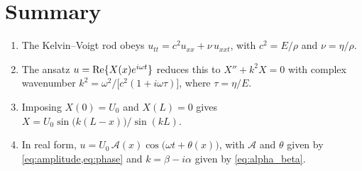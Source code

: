 \section{Summary}

\begin{enumerate}
  \item The Kelvin--Voigt rod obeys
        $u_{tt} = c^2 u_{xx} + \nu\, u_{xxt}$, with $c^2 = E/\rho$ and $\nu = \eta/\rho$.
  \item The ansatz $u = \operatorname{Re}\{X(x)e^{i\omega t}\}$ reduces this to
        $X'' + k^2 X = 0$ with complex wavenumber
        $k^2 = \omega^2/\big[c^2(1+i\omega\tau)\big]$, where $\tau = \eta/E$.
  \item Imposing $X(0)=U_0$ and $X(L)=0$ gives
        $X = U_0\sin\!\big(k(L-x)\big)/\sin(kL)$.
  \item In real form,
        $u = U_0\,\mathcal{A}(x)\cos\!\big(\omega t + \theta(x)\big)$, with
        $\mathcal{A}$ and $\theta$ given by \cref{eq:amplitude,eq:phase} and
        $k = \beta - i\alpha$ given by \cref{eq:alpha_beta}.
\end{enumerate}
